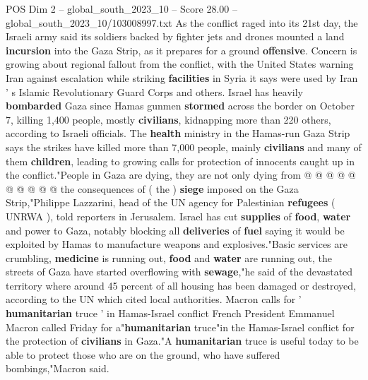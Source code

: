 \begin{textsample}{POS Dim 2 – global\_south\_2023\_10 – Score 28.00 – global\_south\_2023\_10/103008997.txt}
As the conflict raged into its 21st day, the Israeli army said its soldiers backed by fighter jets and drones mounted a land \textbf{incursion} into the Gaza Strip, as it prepares for a ground \textbf{offensive}.
Concern is growing about regional fallout from the conflict, with the United States warning Iran against escalation while striking \textbf{facilities} in Syria it says were used by Iran ' s Islamic Revolutionary Guard Corps and others.
Israel has heavily \textbf{bombarded} Gaza since Hamas gunmen \textbf{stormed} across the border on October 7, killing 1,400 people, mostly \textbf{civilians}, kidnapping more than 220 others, according to Israeli officials.
The \textbf{health} ministry in the Hamas-run Gaza Strip says the strikes have killed more than 7,000 people, mainly \textbf{civilians} and many of them \textbf{children}, leading to growing calls for protection of innocents caught up in the conflict."People in Gaza are dying, they are not only dying from @ @ @ @ @ @ @ @ @ @ the consequences of ( the ) \textbf{siege} imposed on the Gaza Strip,"Philippe Lazzarini, head of the UN agency for Palestinian \textbf{refugees} ( UNRWA ), told reporters in Jerusalem.
Israel has cut \textbf{supplies} of \textbf{food}, \textbf{water} and power to Gaza, notably blocking all \textbf{deliveries} of \textbf{fuel} saying it would be exploited by Hamas to manufacture weapons and explosives."Basic services are crumbling, \textbf{medicine} is running out, \textbf{food} and \textbf{water} are running out, the streets of Gaza have started overflowing with \textbf{sewage},"he said of the devastated territory where around 45 percent of all housing has been damaged or destroyed, according to the UN which cited local authorities.
Macron calls for ' \textbf{humanitarian} truce ' in Hamas-Israel conflict French President Emmanuel Macron called Friday for a"\textbf{humanitarian} truce"in the Hamas-Israel conflict for the protection of \textbf{civilians} in Gaza."A \textbf{humanitarian} truce is useful today to be able to protect those who are on the ground, who have suffered bombings,"Macron said.

\end{textsample}
